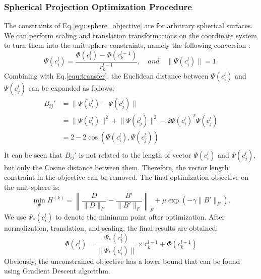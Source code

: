 \documentclass{article}
\theoremstyle{definition}
\begin{document}
    \subsubsection{Spherical Projection Optimization Procedure}
    The constraints of Eq.\ref{equ:sphere_objective} are for arbitrary spherical surfaces. We can perform scaling and translation transformations on the coordinate system to turn them into the unit sphere constraints, namely the following conversion :
    \begin{equation}
    	\label{equ:transfer}
    	\Psi(c_i^l) = \frac{\Phi(c_i^l) - \Phi(c_k^{l-1})}{r_k^{l-1}}, \quad and \quad \lVert \Psi(c_i^l) \rVert = 1.
    \end{equation}
    Combining with Eq.\ref{equ:transfer}, the Euclidean distance between $\Psi(c_i^{l})$ and $\Psi(c_j^l)$ can be expanded as follows: 
    \begin{equation}
    \begin{split}
    \label{equ:bij}
    	B_{ij}' &= \lVert \Psi(c_i^{l}) - \Psi(c_j^l) \rVert \\
    			&= \lVert \Psi(c_i^l) \rVert^2 + \lVert \Psi(c_j^l) \rVert^2 - 2 \Psi(c_i^l)^T \Psi(c_j^l) \\
    			&= 2 - 2\cos(\Psi(c_i^l), \Psi(c_j^l)) \\
    \end{split}
    \end{equation}
    It can be seen that $B_{ij}'$ is not related to the length of vector $\Psi(c_i^l)$ and $\Psi(c_j^l)$, but only the Cosine distance between them. Therefore, the vector length constraint in the objective can be removed. The final optimization objective on the unit sphere is: 
    \begin{equation}
	 	\label{equ:unit_sphere_objective}
            \min_{\Psi} H^{(k)} = \left\lVert\frac{D}{\lVert D \rVert_F} - \frac{B'}{\lVert B' \rVert_F}\right\rVert_F + \mu \exp(- \gamma \lVert B' \rVert_F). 
    \end{equation}
    We use $\Psi_*(c_i^l)$ to denote the minimum point after optimization. After normalization, translation, and scaling, the final results are obtained: 
    \begin{equation}
    	\label{equ:sphere_transformation}
    	\Phi(c_i^l) = \frac{\Psi_*(c_i^l)}{\lVert \Psi_*(c_i^l) \rVert} \times r_k^{l-1} + \Phi(c_k^{l-1}) 
    \end{equation}
    Obviously, the unconstrained objective has a lower bound that can be found using Gradient Descent algorithm.
\end{document}
